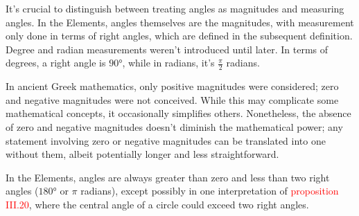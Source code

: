 It's crucial to distinguish between treating angles as magnitudes and measuring angles. In the Elements, angles themselves are the magnitudes, with measurement only done in terms of right angles, which are defined in the subsequent definition. Degree and radian measurements weren't introduced until later. In terms of degrees, a right angle is $\ang{90}$, while in radians, it's $\frac{\pi}{2}$ radians.



In ancient Greek mathematics, only positive magnitudes were considered; zero and negative magnitudes were not conceived. While this may complicate some mathematical concepts, it occasionally simplifies others. Nonetheless, the absence of zero and negative magnitudes doesn't diminish the mathematical power; any statement involving zero or negative magnitudes can be translated into one without them, albeit potentially longer and less straightforward.

In the Elements, angles are always greater than zero and less than two right angles ($\ang{180}$ or $\pi$ radians), except possibly in one interpretation of \textcolor{red}{proposition III.20}, where the central angle of a circle could exceed two right angles.

\clearpage